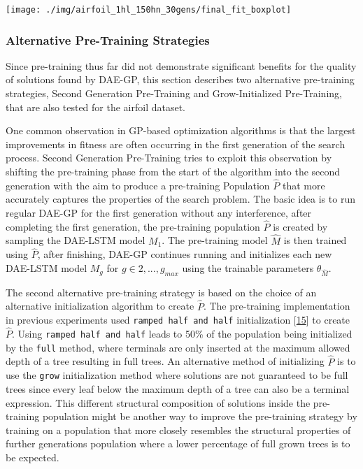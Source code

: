 \documentclass[
  11pt,
]{article}
\let\origfigure\figure
\let\endorigfigure\endfigure
\renewenvironment{figure}[1][2] {
    \expandafter\origfigure\expandafter[H]
} {
    \endorigfigure
}
\begin{document}
\begin{figure}[c]

{\centering \texttt{[image: ./img/airfoil\_1hl\_150hn\_30gens/final\_fit\_boxplot]} 

}

\caption{Fitness after 30 Generations - Airfoil - Single Hidden Layer}\label{fig:airfoil-finalFitness}
\end{figure}

\hypertarget{alternative-pre-training-strategies}{%
\subsubsection{Alternative Pre-Training Strategies}\label{alternative-pre-training-strategies}}

Since pre-training thus far did not demonstrate significant benefits for the quality of solutions found by DAE-GP, this section describes two alternative pre-training strategies, Second Generation Pre-Training and Grow-Initialized Pre-Training, that are also tested for the airfoil dataset.

One common observation in GP-based optimization algorithms is that the largest improvements in fitness are often occurring in the first generation of the search process.
Second Generation Pre-Training tries to exploit this observation by shifting the pre-training phase from the start of the algorithm into the second generation with the aim to produce a pre-training Population \(\hat{P}\) that more accurately captures the properties of the search problem.
The basic idea is to run regular DAE-GP for the first generation without any interference, after completing the first generation, the pre-training population \(\hat{P}\) is created by sampling the DAE-LSTM model \(M_1\).
The pre-training model \(\hat{M}\) is then trained using \(\hat{P}\), after finishing, DAE-GP continues running and initializes each new DAE-LSTM model \(M_g\) for \(g\in{2,...,g_{max}}\) using the trainable parameters \(\theta_{\hat{M}}\).

The second alternative pre-training strategy is based on the choice of an alternative initialization algorithm to create \(\hat{P}\).
The pre-training implementation in previous experiments used \texttt{ramped\ half\ and\ half} initialization {[}\protect\hyperlink{ref-Koza1993GeneticP}{15}{]} to create \(\hat{P}\).
Using \texttt{ramped\ half\ and\ half} leads to 50\% of the population being initialized by the \texttt{full} method, where terminals are only inserted at the maximum allowed depth of a tree resulting in full trees.
An alternative method of initializing \(\hat{P}\) is to use the \texttt{grow} initialization method where solutions are not guaranteed to be full trees since every leaf below the maximum depth of a tree can also be a terminal expression.
This different structural composition of solutions inside the pre-training population might be another way to improve the pre-training strategy by training on a population that more closely resembles the structural properties of further generations population where a lower percentage of full grown trees is to be expected.
\end{document}
